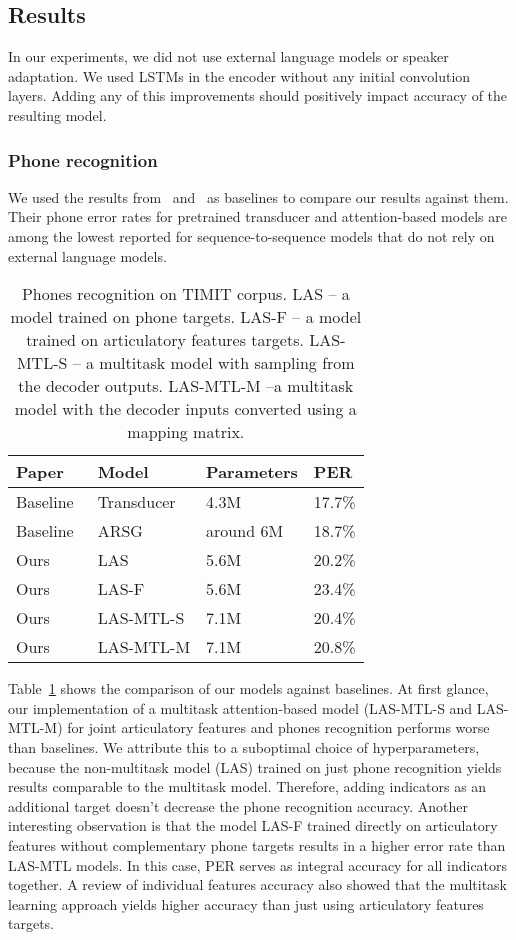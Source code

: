 \documentclass[a4paper]{article}
\begin{document}
\subsection{Results}
In our experiments, we did not use external language models or speaker adaptation. We used LSTMs in the encoder without any initial convolution layers. Adding any of this improvements should positively impact accuracy of the resulting model.

\subsubsection{Phone recognition}
We used the results from~\cite{Graves2013} and~\cite{Chorowski-Att-2015} as baselines to compare our results against them. Their phone error rates for pretrained transducer and attention-based models are among the lowest reported for sequence-to-sequence models that do not rely on external language models.
\begin{table}[th]
  \caption{Phones recognition on TIMIT corpus. LAS -- a model trained on phone targets. LAS-F -- a model trained on articulatory features targets. LAS-MTL-S -- a multitask model with sampling from the decoder outputs. LAS-MTL-M --a  multitask model with the decoder inputs converted using a mapping matrix.}
  \label{tab:PhoneRecTimit}
\centering
  \begin{tabular}{llll}
    \toprule
    \textbf{Paper} & \textbf{Model} & \textbf{Parameters} & \textbf{PER} \\
    \midrule
    Baseline~\cite{Graves2013} & Transducer & 4.3M & 17.7\% \\
    Baseline~\cite{Chorowski-Att-2015} & ARSG & around 6M & 18.7\% \\
    Ours & LAS & 5.6M & 20.2\% \\
    Ours & LAS-F & 5.6M & 23.4\% \\
    Ours & LAS-MTL-S & 7.1M & 20.4\% \\
    Ours & LAS-MTL-M & 7.1M & 20.8\% \\
    \bottomrule
  \end{tabular}
\end{table}

Table~\ref{tab:PhoneRecTimit} shows the comparison of our models against baselines. At first glance, our implementation of a multitask attention-based model (LAS-MTL-S and LAS-MTL-M) for joint articulatory features and phones recognition performs worse than baselines. We attribute this to a suboptimal choice of hyperparameters, because the non-multitask model (LAS) trained on just phone recognition yields results comparable to the multitask model. Therefore, adding indicators as an additional target doesn't decrease the phone recognition accuracy. Another interesting observation is that the model LAS-F trained directly on articulatory features without complementary phone targets results in a higher error rate than LAS-MTL models. In this case, PER serves as integral accuracy for all indicators together. A review of individual features accuracy also showed that the multitask learning approach yields higher accuracy than just using articulatory features targets.
\end{document}
